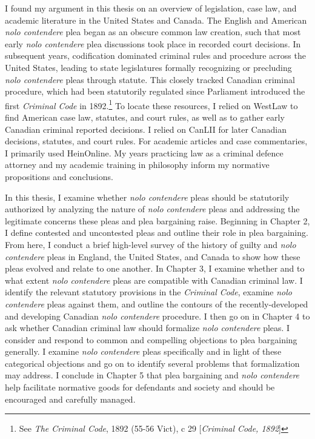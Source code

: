 I found my argument in this thesis on an overview of legislation, case law, and academic literature in the United States and Canada. The English and American \textit{nolo contendere} plea began as an obscure common law creation, such that most early \textit{nolo contendere} plea discussions took place in recorded court decisions. In subsequent years, codification dominated criminal rules and procedure across the United States, leading to state legislatures formally recognizing or precluding \textit{nolo contendere} pleas through statute. This closely tracked Canadian criminal procedure, which had been statutorily regulated since Parliament introduced the first \textit{Criminal Code} in 1892.\footnote{See \textit{The Criminal Code}, 1892 (55-56 Vict), c 29 [\textit{Criminal Code, 1892}]} To locate these resources, I relied on WestLaw to find American case law, statutes, and court rules, as well as to gather early Canadian criminal reported decisions. I relied on CanLII for later Canadian decisions, statutes, and court rules. For academic articles and case commentaries, I primarily used HeinOnline. My years practicing law as a criminal defence attorney and my academic training in philosophy inform my normative propositions and conclusions.

In this thesis, I examine whether \textit{nolo contendere} pleas should be statutorily authorized by analyzing the nature of \textit{nolo contendere} pleas and addressing the legitimate concerns these pleas and plea bargaining raise. Beginning in Chapter 2, I define contested and uncontested pleas and outline their role in plea bargaining. From here, I conduct a brief high-level survey of the history of guilty and \textit{nolo contendere} pleas in England, the United States, and Canada to show how these pleas evolved and relate to one another. In Chapter 3, I examine whether and to what extent \textit{nolo contendere} pleas are compatible with Canadian criminal law. I identify the relevant statutory provisions in the \textit{Criminal Code}, examine \textit{nolo contendere} pleas against them, and outline the contours of the recently-developed and developing Canadian \textit{nolo contendere} procedure. I then go on in Chapter 4 to ask whether Canadian criminal law should formalize \textit{nolo contendere} pleas. I consider and respond to common and compelling objections to plea bargaining generally. I examine \textit{nolo contendere} pleas specifically and in light of these categorical objections and go on to identify several problems that formalization may address. I conclude in Chapter 5 that plea bargaining and \textit{nolo contendere} help facilitate normative goods for defendants and society and should be encouraged and carefully managed.